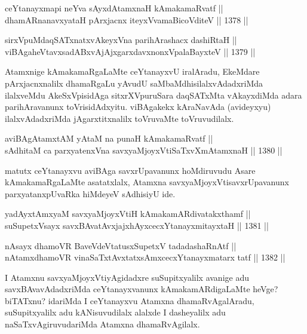 \begin{shl}
ceYtanayxmapi neYva sAyxdAtamxnaH kAmakamaRvatf || \\
dhamARnanavxyataH pArxjacnx iteyxVvamaBicoVditeV \hfill || 1378 ||  
\end{shl}
				
\begin{shl}
sirxVpuMdaqSATxnatxvAkeyxVna parihArashacx dashiRtaH || \\
viBAgaheVtavxsadABxvAjAjxgarxdavxnonxVpalaBayxteV \hfill || 1379 ||  
\end{shl}

\begin{artha}
Atamxnige kAmakamaRgaLaMte ceYtanayxvU iralAradu, EkeMdare pArxjacnxnalilx dhamaRgaLu yAvudU saMbaMdhisilalxvAdadxriMda ilalxveMdu AkeSxVpisidAga sitxrXVpuruSara daqSATxMta vAkayxdiMda adara parihAravanunx toVrisidAdxyitu. viBAgakekx kAraNavAda (avideyxyu) ilalxvAdadxriMda jAgarxtitxnalilx toVruvaMte toVruvudilalx.
\end{artha}

\begin{shl}
aviBAgAtamxtAM yAtaM na punaH kAmakamaRvatf || \\
sAdhitaM ca parxyatenxVna savxyaMjoyxVtiSaTxvXmAtamxnaH \hfill || 1380 ||  
\end{shl}

\begin{artha}
matutx ceYtanayxvu aviBAga savxrUpavanunx hoMdiruvudu Asare kAmakamaRgaLaMte asatatxlalx, Atamxna savxyaMjoyxVtisavxrUpavanunx parxyatanxpUvaRka hiMdeyeV sAdhisiyU ide.
\end{artha}


\begin{shl}
yadAyxtAmx\s yaM savxyaMjoyxVtiH kAmakamARdivatakxthamf || \\
suSupetxV\s sayx savxBAvatAvxjajxhAyxcecxYtanayxmitayxtaH \hfill || 1381 ||  
\end{shl}
				
\begin{shl}
nAsayx dhamoVR BaveVdeVtatusxSupetxV tadadashaRnAtf ||  \\
nA\s \s tamxdhamoVR vinaSaTxtAvxtatxsAmxcecxYtanayxmatarx tatf \hfill || 1382 ||  
\end{shl}

\begin{artha}
I Atamxnu savxyaMjoyxVtiyAgidadxre suSupitxyalilx avanige adu savxBAvavAdadxriMda ceYtanayxvanunx kAmakamARdigaLaMte heVge? biTATxnu? idariMda I ceYtanayxvu Atamxna dhamaRvAgalAradu, suSupitxyalilx adu kANisuvudilalx alalxde I dasheyalilx adu naSaTxvAgiruvudariMda Atamxna dhamaRvAgilalx.
\end{artha}

